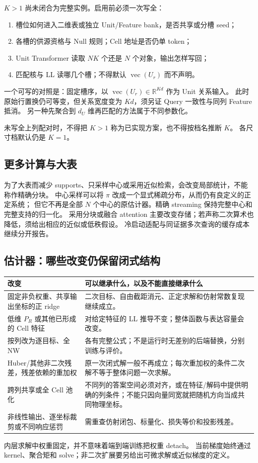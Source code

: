 \documentclass[11pt,UTF8,fontset=fandol]{ctexart}
\numberwithin{equation}{section}
\theoremstyle{definition}
\newcommand{\R}{\mathbb R}
\begin{document}
$K>1$ 尚未闭合为完整实例。启用前必须一次写全：
\begin{enumerate}
\item 槽位如何进入二维表或独立 Unit/Feature bank，是否共享或分槽 seed；
\item 各槽的供源资格与 Null 规则；Cell 地址是否仍单 token；
\item Unit Transformer 读取 $NK$ 个还是 $N$ 个对象，输出怎样写回；
\item 匹配核与 LL 读哪几个槽；不得默认 $\operatorname{vec}(U_r)$ 而不声明。
\end{enumerate}
一个可写的对照是：固定槽序，以 $\operatorname{vec}(U_r)\in\R^{Kd}$ 作为 Unit 关系输入。
此时原始行置换仍可等变，但关系宽度变为 $Kd$，须另证 Query 一致性与同列 Feature 抵消。
另一种先聚合到 $d_U$ 维再匹配的方法属于不同参数化。

未写全上列配对时，不得把 $K>1$ 称为已实现方案，也不得按档名推断 $K$。
各尺寸档默认仍是 $K=1$。

\subsection{更多计算与大表}
为了大表而减少 supports、只采样中心或采用近似检索，会改变局部统计，不能称作精确分块。
中心采样可以将 $\pi$ 改成一个显式稀疏分布，从而仍有良定义的正定系统；
但它不再是全部 $N$ 个中心的原估计器。精确 streaming 保持完整中心和完整支持的归一化。
采用分块或融合 attention 主要改变存储；若声称二次算术也降低，须给出相应的近似或低秩假设。
冷启动适配与同证据多次查询的缓存成本继续分开报告。

\subsection{估计器：哪些改变仍保留闭式结构}
\begin{center}\small
\begin{tabularx}{\linewidth}{>{\raggedright\arraybackslash}p{41mm}X}
\toprule
改变 & 可以继承什么，以及不能直接继承什么\\\midrule
固定非负权重、共享输出坐标的正 ridge & 二次目标、自由截距消元、正定求解和仿射常数复现继续成立。\\
低维 $P_R$ 或其他已形成的 Cell 特征 & 对给定特征的 LL 推导不变；整体函数与表达容量会改变。\\
按列改为逐目标、全 NW & 各有完整公式；不是运行时无差别的后端替换，分别训练与评价。\\
Huber/其他非二次残差，残差依赖的重加权 & 原一次闭式解一般不再成立；每次重加权的条件二次解不等于整体问题一次求解。\\
跨列共享或全 Cell 池化 & 不同列的答案空间必须对齐，或在特征/解码中提供明确的列条件；不能只因向量同宽就把随机方向当成共同物理坐标。\\
非线性输出、逐坐标裁剪或不同响应惩罚 & 需重查仿射闭包、标量化、损失等价和投影残差。\\
\bottomrule
\end{tabularx}
\end{center}
内层求解中权重固定，并不意味着端到端训练把权重 detach。
当前梯度始终通过 kernel、聚合矩和 solve；非二次扩展要另给出可微求解或近似梯度的定义。
\end{document}
